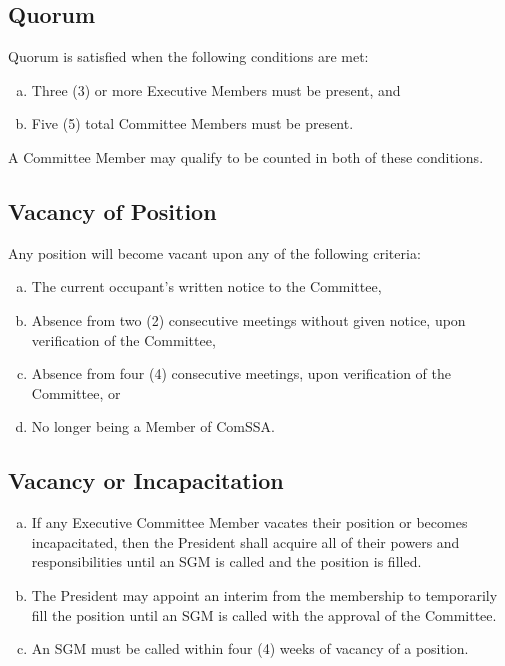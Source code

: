 \documentclass[a4paper,12pt]{article}
\begin{document}
\subsection{Quorum}

Quorum is satisfied when the following conditions are met:

\begin{enumerate}[a)]
	\item Three (3) or more Executive Members must be present, and
	\item Five (5) total Committee Members must be present.
\end{enumerate}

A Committee Member may qualify to be counted in both of these conditions.

\subsection{Vacancy of Position}

Any position will become vacant upon any of the following criteria:

\begin{enumerate}[a)]
	\item The current occupant's written notice to the Committee,
	\item Absence from two (2) consecutive meetings without given notice, upon verification of the Committee,
	\item Absence from four (4) consecutive meetings, upon verification of the Committee, or
	\item No longer being a Member of ComSSA.
\end{enumerate}

\subsection{Vacancy or Incapacitation}

\begin{enumerate}[a)]
	\item If any Executive Committee Member vacates their position or becomes incapacitated, then the President shall acquire all of their powers and responsibilities until an SGM is called and the position is filled.
	\item The President may appoint an interim from the membership to temporarily fill the position until an SGM is called with the approval of the Committee.
	\item An SGM must be called within four (4) weeks of vacancy of a position.
\end{enumerate}
\end{document}
